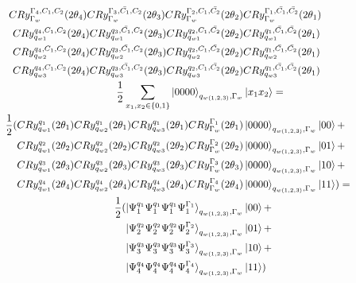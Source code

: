 \begin{equation}
   \resizebox{.9\hsize}{!}{$\begin{split}
        CRy_{\Gamma_w}^{\Gamma_4,C_1,C_2}(2\theta_4)CRy_{\Gamma_w}^{\Gamma_3,\bar{C_1},C_2}(2\theta_3)CRy_{\Gamma_w}^{\Gamma_2,C_1,\bar{C_2}}(2\theta_2)&CRy_{\Gamma_w}^{\Gamma_1,\bar{C_1},\bar{C_2}}(2\theta_1)\\
        CRy_{q_{w1}}^{q_4,C_1,C_2}(2\theta_4)CRy_{q_{w1}}^{q_3,\bar{C_1},C_2}(2\theta_3)CRy_{q_{w1}}^{q_2,C_1,\bar{C_2}}(2\theta_2)&CRy_{q_{w1}}^{q_1,\bar{C_1},\bar{C_2}}(2\theta_1)\\
        CRy_{q_{w2}}^{q_4,C_1,C_2}(2\theta_4)CRy_{q_{w2}}^{q_3,\bar{C_1},C_2}(2\theta_3)CRy_{q_{w2}}^{q_2,C_1,\bar{C_2}}(2\theta_2)&CRy_{q_{w2}}^{q_1,\bar{C_1},\bar{C_2}}(2\theta_1)\\
        CRy_{q_{w3}}^{q_4,C_1,C_2}(2\theta_4)CRy_{q_{w3}}^{q_3,\bar{C_1},C_2}(2\theta_3)CRy_{q_{w3}}^{q_2,C_1,\bar{C_2}}(2\theta_2)&CRy_{q_{w3}}^{q_1,\bar{C_1},\bar{C_2}}(2\theta_1)\\
        \frac{1}{2}\sum_{x_1,x_2\in\{0,1\}}\ket{0000}_{q_{w(1,2,3)},\Gamma_w}&\ket{ x_1x_2}=\\
        \frac{1}{2}(
        CRy_{q_{w1}}^{q_1}(2\theta_1)CRy_{q_{w2}}^{q_1}(2\theta_1)CRy_{q_{w3}}^{q_1}(2\theta_1) CRy_{\Gamma_w}^{\Gamma_1}(2\theta_1)&\ket{0000}_{q_{w(1,2,3)},\Gamma_w}\ket{ 00}+\\
        CRy_{q_{w1}}^{q_2}(2\theta_2)CRy_{q_{w2}}^{q_2}(2\theta_2)CRy_{q_{w3}}^{q_2}(2\theta_2) CRy_{\Gamma_w}^{\Gamma_2}(2\theta_2)&\ket{0000}_{q_{w(1,2,3)},\Gamma_w}\ket{ 01}+\\
        CRy_{q_{w1}}^{q_3}(2\theta_3)CRy_{q_{w2}}^{q_3}(2\theta_3)CRy_{q_{w3}}^{q_3}(2\theta_3) CRy_{\Gamma_w}^{\Gamma_3}(2\theta_3)&\ket{0000}_{q_{w(1,2,3)},\Gamma_w}\ket{ 10}+\\
        CRy_{q_{w1}}^{q_4}(2\theta_4)CRy_{q_{w2}}^{q_4}(2\theta_4)CRy_{q_{w3}}^{q_4}(2\theta_4) CRy_{\Gamma_w}^{\Gamma_4}(2\theta_4)&\ket{0000}_{q_{w(1,2,3)},\Gamma_w}\ket{ 11})=\\
        \frac{1}{2}(
        \ket{\Psi^{q_1}_1\Psi^{q_1}_1\Psi^{q_1}_1\Psi^{\Gamma_1}_1}_{q_{w(1,2,3)},\Gamma_w}&\ket{ 00}+\\
        \ket{\Psi^{q_2}_2\Psi^{q_2}_2\Psi^{q_2}_2\Psi^{\Gamma_2}_2}_{q_{w(1,2,3)},\Gamma_w}&\ket{ 01}+\\
        \ket{\Psi^{q_3}_3\Psi^{q_3}_3\Psi^{q_3}_3\Psi^{\Gamma_3}_3}_{q_{w(1,2,3)},\Gamma_w}&\ket{ 10}+\\
        \ket{\Psi^{q_4}_4\Psi^{q_4}_4\Psi^{q_4}_4\Psi^{\Gamma_4}_4}_{q_{w(1,2,3)},\Gamma_w}&\ket{ 11}
        )
   \end{split}$}
\end{equation}
